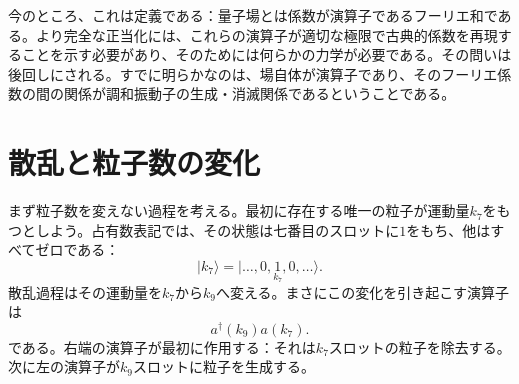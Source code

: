 今のところ、これは定義である：量子場とは係数が演算子であるフーリエ和である。より完全な正当化には、これらの演算子が適切な極限で古典的係数を再現することを示す必要があり、そのためには何らかの力学が必要である。その問いは後回しにされる。すでに明らかなのは、場自体が演算子であり、そのフーリエ係数の間の関係が調和振動子の生成・消滅関係であるということである。

\begin{classroomqa}
\end{classroomqa}

\section{散乱と粒子数の変化}

まず粒子数を変えない過程を考える。最初に存在する唯一の粒子が運動量\(k_7\)をもつとしよう。占有数表記では、その状態は七番目のスロットに\(1\)をもち、他はすべてゼロである：
\begin{equation}
|k_7\rangle
=
|\ldots,0,\underset{k_7}{1},0,\ldots\rangle.
\end{equation}
散乱過程はその運動量を\(k_7\)から\(k_9\)へ変える。まさにこの変化を引き起こす演算子は
\begin{equation}
a^\dagger(k_9)a(k_7).
\end{equation}
である。右端の演算子が最初に作用する：それは\(k_7\)スロットの粒子を除去する。次に左の演算子が\(k_9\)スロットに粒子を生成する。

\begin{classroomqa}
\end{classroomqa}


